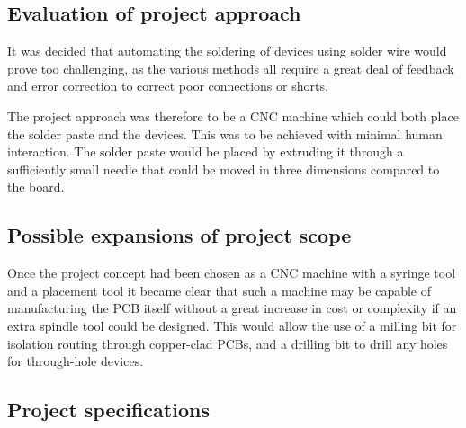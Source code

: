 \subsection{Evaluation of project approach}
It was decided that automating the soldering of devices using solder wire
would prove too challenging, as the various methods all require a great
deal of feedback and error correction to correct poor connections or shorts.


The project approach was therefore to be a CNC machine which could both place the 
solder paste and the devices. This was to be achieved with minimal human
interaction. The solder paste would be placed by extruding it through
a sufficiently small needle that could be moved in three dimensions
compared to the board.


\subsection{Possible expansions of project scope}
Once the project concept had been chosen as a CNC machine with a syringe
tool and a placement tool it became clear that such a machine may be 
capable of manufacturing the PCB itself without a great increase in cost
or complexity if an extra spindle tool could be designed. This would
allow the use of a milling bit for isolation routing through copper-clad
PCBs, and a drilling bit to drill any holes for through-hole devices.

\subsection{Project specifications}



